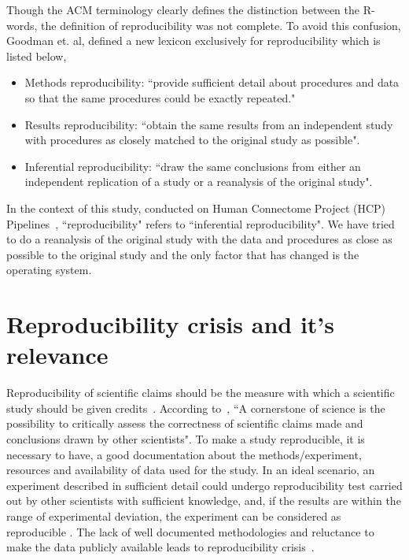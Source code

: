 Though the ACM terminology clearly defines the distinction between the R-words, the definition of reproducibility was not complete. To avoid this confusion, Goodman et. al, defined a new lexicon exclusively for reproducibility \cite{Goodman2016} which is listed below,

\begin{itemize}
\item {Methods reproducibility: ``provide sufficient detail about procedures and data so that the same procedures could be exactly repeated."}
\item {Results reproducibility: ``obtain the same results from an independent study with procedures as closely matched to the original study as possible".}
\item {Inferential reproducibility: ``draw the same conclusions from either an independent replication of a study or a reanalysis of the original study".}
\end{itemize}

In the context of this study, conducted on Human Connectome Project (HCP) Pipelines~\cite{Gla13}, ``reproducibility" refers to ``inferential reproducibility". We have tried to do a reanalysis of the original study with the data and procedures as close as possible to the original study and the only factor that has changed is the operating system.

\section{Reproducibility crisis and it's relevance}
Reproducibility of scientific claims should be the measure with which a scientific study should be given credits~\cite{Estimating-reproducibility}. According to~\cite{Plesser2018}, ``A cornerstone of science is the possibility to critically assess the correctness of scientific claims made and conclusions drawn by other scientists".
To make a study reproducible, it is necessary to have, a good documentation about the methods/experiment, resources and availability of data used for the study. In an ideal scenario, an experiment described in sufficient detail could undergo reproducibility test carried out by other scientists with sufficient knowledge, and, if the results are within the range of experimental deviation, the experiment can be considered as reproducible \cite{Plesser2018}. The lack of well documented methodologies and reluctance to make the data publicly available leads to reproducibility crisis~\cite{Baker2016}.

